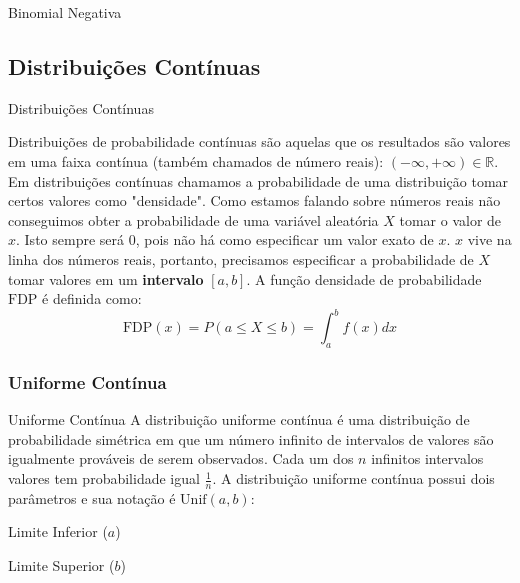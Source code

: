 \begin{frame}{Binomial Negativa}
	\centering
\end{frame}


\subsection{Distribuições Contínuas}
\begin{frame}{Distribuições Contínuas}
	\begin{defn}
		\small
		Distribuições de probabilidade contínuas são aquelas que os resultados
		são valores em uma faixa contínua (também chamados de número reais):
		$(-\infty, +\infty) \in \mathbb{R}$.
		Em distribuições contínuas chamamos a probabilidade de uma distribuição
		tomar certos valores como "densidade". Como estamos falando sobre
		números reais não conseguimos obter a probabilidade de uma variável aleatória
		$X$ tomar o valor de $x$. Isto sempre será $0$, pois não há como especificar
		um valor exato de $x$. $x$ vive na linha dos números reais, portanto,
		precisamos especificar a probabilidade de $X$ tomar valores em um \textbf{intervalo}
		$[a,b]$. A função densidade de probabilidade $\text{FDP}$ é definida como:
		$$\text{FDP}(x) = P(a \leq X \leq b) = \int_a^b f(x) dx$$
	\end{defn}
\end{frame}

\subsubsection{Uniforme Contínua}
\begin{frame}{Uniforme Contínua}
	A distribuição uniforme contínua é uma distribuição de probabilidade simétrica em que um número infinito de intervalos de valores
	são igualmente prováveis de serem observados. Cada um dos $n$ infinitos intervalos valores tem probabilidade igual $\frac{1}{n}$.
	\vfill
	A distribuição uniforme contínua possui dois parâmetros e sua notação é $\text{Unif}(a, b)$:
	\begin{vfilleditems}
		\item Limite Inferior ($a$)
		\item Limite Superior ($b$)
	\end{vfilleditems}
\end{frame}

